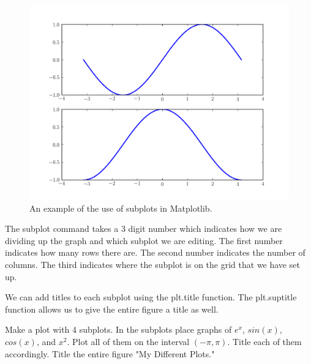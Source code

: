 \begin{figure}
\includegraphics[width=\textwidth]{subplots.pdf}
\caption{An example of the use of subplots in Matplotlib.}
\label{mpl:subplots}
\end{figure}

The subplot command takes a 3 digit number which indicates how we are dividing up the graph and which subplot we are editing.
The first number indicates how many rows there are.
The second number indicates the number of columns.
The third indicates where the subplot is on the grid that we have set up. 

We can add titles to each subplot using the plt.title function.
The plt.suptitle function allows us to give the entire figure a title as well.

\begin{problem}
Make a plot with 4 subplots.
In the subplots place graphs of $e^x$, $sin(x)$, $cos(x)$, and $x^2$.
Plot all of them on the interval $(-\pi,\pi)$.
Title each of them accordingly.
Title the entire figure "My Different Plots."
\end{problem}